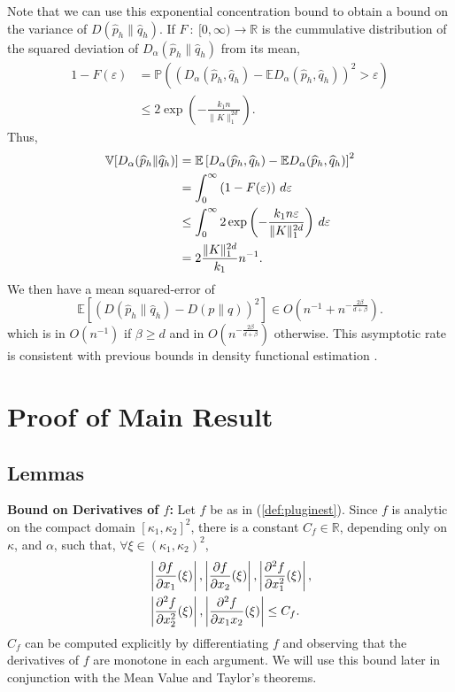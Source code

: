 \documentclass{article}
\newcommand{\inv}{^{-1}}                            %
\newcommand{\R}{\mathbb{R}}                         %
\newcommand{\e}{\varepsilon}                        %
\newcommand{\E}{\mathbb{E}}                         %
\newcommand{\V}{\mathbb{V}}                         %
\newcommand{\pr}{\mathbb{P}}                        %
\newcommand{\cpest}{\widehat{p}_h}                  %
\newcommand{\cqest}{\widehat{q}_h}                  %
\begin{document}
Note that we can use this exponential concentration bound to obtain a bound on
the variance of $D(\cpest\|\cqest)$. If $F~:~[0,\infty)\to\R$ is the
cummulative distribution of the squared deviation of $D_\alpha(\cpest\|\cqest)$
from its mean,
\begin{align*}
1 - F(\e)
 &  = \pr \left( (D_\alpha(\cpest,\cqest) - \E D_\alpha(\cpest,\cqest))^2
                                                            > \e \right)    \\
 &  \leq 2\exp \left( -\frac{k_1n}{\|K\|_1^{2d}} \right).
\end{align*}
Thus,
\begin{align}
\notag
\V[D_\alpha(\cpest\|\cqest)]
 &  = \E\left[ D_\alpha(\cpest,\cqest) - \E D_\alpha(\cpest,\cqest)\right]^2 \\
\notag
 &  = \int_0^\infty \left( 1 - F(\e) \right) \, d\e    \\
\notag
 &  \leq \int_0^\infty 2\exp \left(-\frac{k_1n\e}{\|K\|_1^{2d}}\right) \, d\e \\
\label{ineq:fin_var_bnd}
 &  = 2 \frac{\|K\|_1^{2d}}{k_1}n\inv.
\end{align}
We then have a mean squared-error of
\[\E \left[ \left( D(\cpest\|\cqest) - D(p\|q) \right)^2 \right]
    \in O \left( n\inv + n^{-\frac{2\beta}{d + \beta}} \right).
\]
which is in $O(n\inv)$ if $\beta \geq d$ and in
$O\left( n^{-\frac{2\beta}{d + \beta}} \right)$ otherwise. This asymptotic rate
is consistent with previous bounds in density functional estimation
\citep{birge95estimation,2010arXiv1012.4188S}.

\section{Proof of Main Result} \label{sec:Proofs}
\subsection{Lemmas}

{\bf Bound on Derivatives of $f$:}
Let $f$ be as in (\ref{def:pluginest}). Since $f$ is analytic on the compact
domain $[\kappa_1,\kappa_2]^2$, there is a constant $C_f \in \R$, depending
only on $\kappa$, and $\alpha$, such that,
$\forall \xi \in (\kappa_1,\kappa_2)^2$,
\begin{align}
\notag
&  \left| \frac{\partial f}{\partial x_1} (\xi) \right|,
   \left| \frac{\partial f}{\partial x_2} (\xi) \right|,
   \left| \frac{\partial^2 f}{\partial x_1^2} (\xi) \right|,   \\
\label{ineq:parts}
&   \left| \frac{\partial^2 f}{\partial x_2^2} (\xi) \right|,
    \left| \frac{\partial^2 f}{\partial x_1x_2} (\xi) \right|
 \leq C_f.
\end{align}
$C_f$ can be computed explicitly by differentiating $f$ and observing that the
derivatives of $f$ are monotone in each argument. We will use this bound later
in conjunction with the Mean Value and Taylor's theorems.
\end{document}
